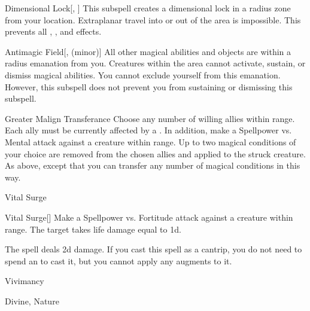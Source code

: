 \begin{ability}[\nth{5}]{Dimensional Lock}[, ]
This subspell creates a dimensional lock in a \arealarge radius zone from your location.
Extraplanar travel into or out of the area is impossible.
This prevents all , , and  effects.
\end{ability}
\vspace{0.25em}


\begin{ability}[\nth{7}]{Antimagic Field}[,  (minor)]
All other magical abilities and objects are  within a \areasmall radius emanation from you.
Creatures within the area cannot activate, sustain, or dismiss magical abilities.
You cannot exclude yourself from this emanation.
However, this subspell does not prevent you from sustaining or dismissing this subspell.
\end{ability}
\vspace{0.25em}


\begin{ability}[\nth{7}]{Greater Malign Transferance}
Choose any number of willing allies within \rngmed range.
Each ally must be currently affected by a  .
In addition, make a Spellpower vs. Mental attack against a creature within \rngmed range.
\hit Up to two magical conditions of your choice are removed from the chosen allies and applied to the struck creature.
\crit As above, except that you can transfer any number of magical conditions in this way.
\end{ability}
\vspace{0.25em}

\newpage
\begin{spellsection}{Vital Surge}


\begin{ability}{Vital Surge}[]
Make a Spellpower vs. Fortitude attack against a creature within \rngmed range.
\hit The target takes life damage equal to  \plus1d.
\end{ability}



 The spell deals \minus2d damage. If you cast this spell as a cantrip,
you do not need to spend an  to cast it,
but you cannot apply any augments to it.


 Vivimancy

 Divine, Nature
\end{spellsection}


